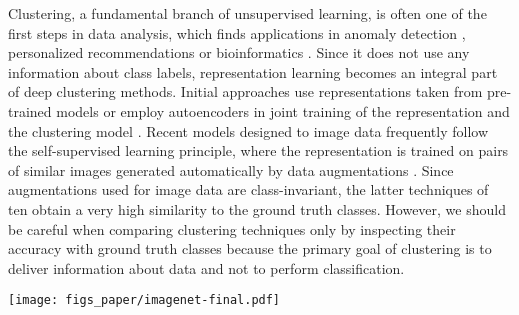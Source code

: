 \documentclass[runningheads]{llncs}
\def\our{CoHiClust}
\begin{document}
Clustering, a fundamental branch of unsupervised learning, is often one of the first steps in data analysis, which finds applications in anomaly detection \cite{barai2017outlier}, personalized recommendations \cite{zhang2014taxonomy} or bioinformatics \cite{lakhani2015clustering}. Since it does not use any information about class labels, representation learning becomes an integral part of deep clustering methods. Initial approaches use representations taken from pre-trained models \cite{guerin2017cnn,naumov2021objective} or employ autoencoders in joint training of the representation and the clustering model \cite{guo2017improved,mautz2019deep}. Recent models designed to image data frequently follow the self-supervised learning principle, where the representation is trained on pairs of similar images generated automatically by data augmentations \cite{li2021contrastive,dang2021nearest}.
Since augmentations used for image data are class-invariant, the latter techniques of ten obtain a very high similarity to the ground truth classes. However, we should be careful when comparing clustering techniques only by inspecting their accuracy with ground truth classes because the primary goal of clustering is to deliver information about data and not to perform classification. 


\begin{figure*}[!htb]
    \centering
    \texttt{[image: figs\_paper/imagenet-final.pdf]}
    \caption{{\bf A hierarchy generated by \our{} for ImageNet-10.} As can be seen, \our{} reliably reflected the ground-truth classes in leaf nodes. In addition to information delivered by flat partition, in hierarchical models neighbor leaves contain images sharing similar characteristic. It is evident that images with soccer ball are similar to pictures with oranges because of their shapes. Dogs are more similar to leopards than to penguins, which is reflected in the constructed hierarchy. The same hold when analyzing the leafs representing cars, trucks and ships. Looking at the first hierarchy level, we observe a distinction on the right sub-tree representing machines and left-sub-tree dominated by animals. Moreover, balls and oranges are separated from the animal branch.}
    \label{fig:imagenet}
\end{figure*}
\end{document}
